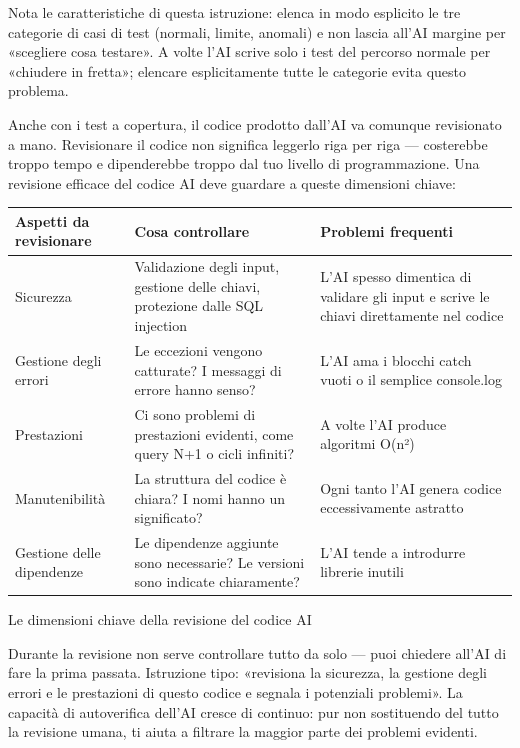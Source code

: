 Nota le caratteristiche di questa istruzione: elenca in modo esplicito le tre categorie di casi di test (normali, limite, anomali) e non lascia all'AI margine per «scegliere cosa testare». A volte l'AI scrive solo i test del percorso normale per «chiudere in fretta»; elencare esplicitamente tutte le categorie evita questo problema.


Anche con i test a copertura, il codice prodotto dall'AI va comunque revisionato a mano. Revisionare il codice non significa leggerlo riga per riga — costerebbe troppo tempo e dipenderebbe troppo dal tuo livello di programmazione. Una revisione efficace del codice AI deve guardare a queste dimensioni chiave:

\begin{center}
\begin{tabularx}{\linewidth}{|X|X|X|}
\hline
\textbf{Aspetti da revisionare} & \textbf{Cosa controllare} & \textbf{Problemi frequenti} \tabularnewline
\hline
Sicurezza & Validazione degli input, gestione delle chiavi, protezione dalle SQL injection & L'AI spesso dimentica di validare gli input e scrive le chiavi direttamente nel codice \tabularnewline
Gestione degli errori & Le eccezioni vengono catturate? I messaggi di errore hanno senso? & L'AI ama i blocchi catch vuoti o il semplice console.log \tabularnewline
Prestazioni & Ci sono problemi di prestazioni evidenti, come query N+1 o cicli infiniti? & A volte l'AI produce algoritmi O(n²) \tabularnewline
Manutenibilità & La struttura del codice è chiara? I nomi hanno un significato? & Ogni tanto l'AI genera codice eccessivamente astratto \tabularnewline
Gestione delle dipendenze & Le dipendenze aggiunte sono necessarie? Le versioni sono indicate chiaramente? & L'AI tende a introdurre librerie inutili \tabularnewline
\hline
\end{tabularx}
\end{center}

\begin{center}\small\color{gray}Le dimensioni chiave della revisione del codice AI\end{center}

Durante la revisione non serve controllare tutto da solo — puoi chiedere all'AI di fare la prima passata. Istruzione tipo: «revisiona la sicurezza, la gestione degli errori e le prestazioni di questo codice e segnala i potenziali problemi». La capacità di autoverifica dell'AI cresce di continuo: pur non sostituendo del tutto la revisione umana, ti aiuta a filtrare la maggior parte dei problemi evidenti.

